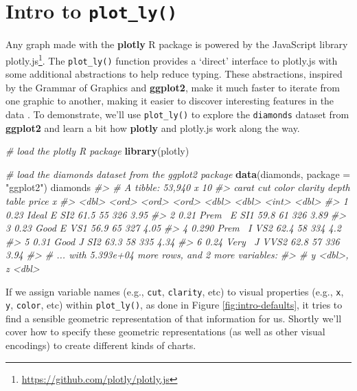 \documentclass[
  12pt,
]{krantz}
\newenvironment{Shaded}{\begin{snugshade}}{\end{snugshade}}
\newcommand{\CommentTok}[1]{\textcolor[rgb]{0.56,0.35,0.01}{\textit{#1}}}
\newcommand{\DataTypeTok}[1]{\textcolor[rgb]{0.13,0.29,0.53}{#1}}
\newcommand{\KeywordTok}[1]{\textcolor[rgb]{0.13,0.29,0.53}{\textbf{#1}}}
\newcommand{\NormalTok}[1]{#1}
\newcommand{\StringTok}[1]{\textcolor[rgb]{0.31,0.60,0.02}{#1}}
\renewcommand{\href}[2]{#2\footnote{\url{#1}}}
\begin{document}
\hypertarget{intro-plotly}{%
\section{\texorpdfstring{Intro to \texttt{plot\_ly()}}{Intro to plot\_ly()}}\label{intro-plotly}}


Any graph made with the \textbf{plotly} R package is powered by the JavaScript library \href{https://github.com/plotly/plotly.js}{plotly.js}. The \texttt{plot\_ly()} function provides a `direct' interface to plotly.js with some additional abstractions to help reduce typing. These abstractions, inspired by the Grammar of Graphics and \textbf{ggplot2}, make it much faster to iterate from one graphic to another, making it easier to discover interesting features in the data \citep{Wilkinson:2005, ggplot2}. To demonstrate, we'll use \texttt{plot\_ly()} to explore the \texttt{diamonds} dataset from \textbf{ggplot2} and learn a bit how \textbf{plotly} and plotly.js work along the way.

\begin{Shaded}
\begin{Highlighting}[]
\CommentTok{# load the plotly R package}
\KeywordTok{library}\NormalTok{(plotly)}

\CommentTok{# load the diamonds dataset from the ggplot2 package}
\KeywordTok{data}\NormalTok{(diamonds, }\DataTypeTok{package =} \StringTok{"ggplot2"}\NormalTok{)}
\NormalTok{diamonds}
\CommentTok{#> # A tibble: 53,940 x 10}
\CommentTok{#>   carat cut   color clarity depth table price     x}
\CommentTok{#>   <dbl> <ord> <ord> <ord>   <dbl> <dbl> <int> <dbl>}
\CommentTok{#> 1 0.23  Ideal E     SI2      61.5    55   326  3.95}
\CommentTok{#> 2 0.21  Prem~ E     SI1      59.8    61   326  3.89}
\CommentTok{#> 3 0.23  Good  E     VS1      56.9    65   327  4.05}
\CommentTok{#> 4 0.290 Prem~ I     VS2      62.4    58   334  4.2 }
\CommentTok{#> 5 0.31  Good  J     SI2      63.3    58   335  4.34}
\CommentTok{#> 6 0.24  Very~ J     VVS2     62.8    57   336  3.94}
\CommentTok{#> # ... with 5.393e+04 more rows, and 2 more variables:}
\CommentTok{#> #   y <dbl>, z <dbl>}
\end{Highlighting}
\end{Shaded}

If we assign variable names (e.g., \texttt{cut}, \texttt{clarity}, etc) to visual properties (e.g., \texttt{x}, \texttt{y}, \texttt{color}, etc) within \texttt{plot\_ly()}, as done in Figure \ref{fig:intro-defaults}, it tries to find a sensible geometric representation of that information for us. Shortly we'll cover how to specify these geometric representations (as well as other visual encodings) to create different kinds of charts.
\end{document}
